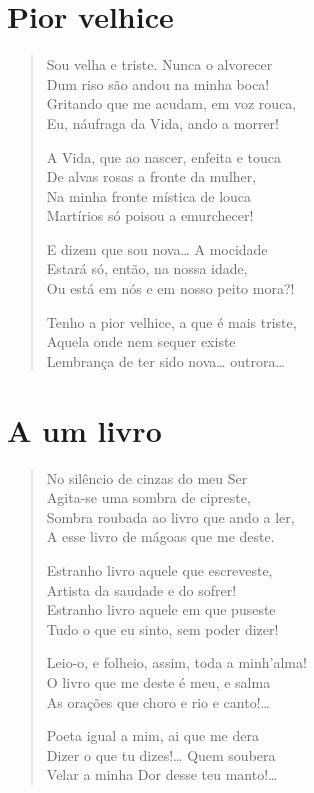 \chapter{Pior velhice}

\begin{verse}
Sou velha e triste. Nunca o alvorecer\\
Dum riso são andou na minha boca!\\
Gritando que me acudam, em voz rouca,\\
Eu, náufraga da Vida, ando a morrer!

A Vida, que ao nascer, enfeita e touca\\
De alvas rosas a fronte da mulher,\\
Na minha fronte mística de louca\\
Martírios só poisou a emurchecer!

E dizem que sou nova\ldots{} A mocidade\\
Estará só, então, na nossa idade,\\
Ou está em nós e em nosso peito mora?!

Tenho a pior velhice, a que é mais triste,\\
Aquela onde nem sequer existe\\
Lembrança de ter sido nova\ldots{} outrora\ldots{} 
\end{verse}

\chapter{A um livro}

\begin{verse}
No silêncio de cinzas do meu Ser\\
Agita-se uma sombra de cipreste,\\
Sombra roubada ao livro que ando a ler,\\
A esse livro de mágoas que me deste.

Estranho livro aquele que escreveste,\\
Artista da saudade e do sofrer!\\
Estranho livro aquele em que puseste\\
Tudo o que eu sinto, sem poder dizer!

Leio-o, e folheio, assim, toda a minh’alma!\\
O livro que me deste é meu, e salma\\
As orações que choro e rio e canto!\ldots{}

Poeta igual a mim, ai que me dera\\
Dizer o que tu dizes!\ldots{} Quem soubera\\
Velar a minha Dor desse teu manto!\ldots{} 
\end{verse}

